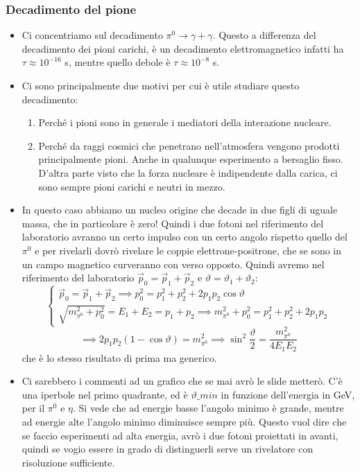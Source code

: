 \subsubsection{Decadimento del pione}
\begin{itemize}
    \item Ci concentriamo sul decadimento $\pi^0\to\gamma+\gamma$. Questo a differenza del decadimento dei pioni carichi, è un decadimento elettromagnetico infatti ha $\tau\approx10^{-16}$ s, mentre quello debole è $\tau\approx10^{-8}$ s.
    \item Ci sono principalmente due motivi per cui è utile studiare questo decadimento:
    \begin{enumerate}
        \item Perché i pioni sono in generale i mediatori della interazione nucleare.
        \item Perché da raggi cosmici che penetrano nell'atmosfera vengono prodotti principalmente pioni. Anche in qualunque esperimento a bersaglio fisso. D'altra parte visto che la forza nucleare è indipendente dalla carica, ci sono sempre pioni carichi e neutri in mezzo.
    \end{enumerate}
    \item In questo caso abbiamo un nucleo origine che decade in due figli di uguale massa, che in particolare è zero! Quindi i due fotoni nel riferimento del laboratorio avranno un certo impulso con un certo angolo rispetto quello del $\pi^0$ e per rivelarli dovrò rivelare le coppie elettrone-positrone, che se sono in un campo magnetico curveranno con verso opposto. Quindi avremo nel riferimento del laboratorio $\vec p_0=\vec p_1+\vec p_2$ e $
    \vartheta=\vartheta_1+\vartheta_2$:
    \begin{equation*}
        \begin{cases}
            \vec p_0=\vec p_1+\vec p_2\implies p_0^2=p_1^2+p_2^2+2p_1p_2\cos\vartheta\\
            \sqrt{m_{\pi^0}^2+p_0^2}=E_1+E_2=p_1+p_2\implies m_{\pi^0}^2+p_0^2=p_1^2+p_2^2+2p_1p_2
        \end{cases}
    \end{equation*}
    \begin{equation*}
        \implies 2p_1p_2(1-\cos\vartheta)=m_{\pi^0}^2\implies \sin^2\frac\vartheta2=\frac{m_{\pi^0}^2}{4E_1E_2}
    \end{equation*}
    che è lo stesso risultato di prima ma generico.
    \item Ci sarebbero i commenti ad un grafico che se mai avrò le slide metterò. C'è una iperbole nel primo quadrante, ed è $\vartheta\_{min}$ in funzione dell'energia in GeV, per il $\pi^0$ e $\eta$. Si vede che ad energie basse l'angolo minimo è grande, mentre ad energie alte l'angolo minimo diminuisce sempre più. Questo vuol dire che se faccio esperimenti ad alta energia, avrò i due fotoni proiettati in avanti, quindi se vogio essere in grado di distinguerli serve un rivelatore con risoluzione sufficiente.

\end{itemize}
